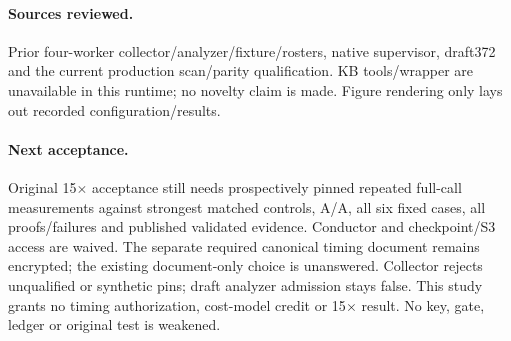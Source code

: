\documentclass[10pt,a4paper]{article}
\begin{document}
\paragraph{Sources reviewed.} Prior four-worker collector/analyzer/fixture/rosters, native supervisor, draft372 and the current production scan/parity qualification. KB tools/wrapper are unavailable in this runtime; no novelty claim is made. Figure rendering only lays out recorded configuration/results.
\paragraph{Next acceptance.} Original 15$\times$ acceptance still needs prospectively pinned repeated full-call measurements against strongest matched controls, A/A, all six fixed cases, all proofs/failures and published validated evidence. Conductor and checkpoint/S3 access are waived. The separate required canonical timing document remains encrypted; the existing document-only choice is unanswered. Collector rejects unqualified or synthetic pins; draft analyzer admission stays false. This study grants no timing authorization, cost-model credit or 15$\times$ result. No key, gate, ledger or original test is weakened.
\end{document}
